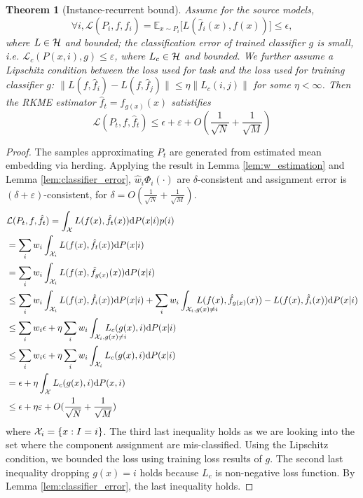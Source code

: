 \documentclass[paper=letter, fontsize=20pt]{article}
\newtheorem{Theorem}{Theorem}
\begin{document}
\begin{Theorem}[Instance-recurrent bound] 
Assume for the source models, $$\forall i, \mathcal{L}(P_i,f, \hat{f}_i)=\mathds{E}_{x\sim P_i }\big[L(\widehat{f}_i(x),f(x))\big]\leq \epsilon,$$ where $L \in \mathcal{H}$ and bounded; the classification error of trained classifier $g$ is small, i.e. $\mathcal{L}_c(P(x,i),g)\leq \varepsilon$, where $L_c \in \mathcal{H}$ and bounded. We further assume a Lipschitz condition between the loss used for task and the loss used for training classifier $g$: $\|L(f, \hat{f}_i) -L(f, \hat{f}_j)\| \leq \eta \| L_c(i,j) \| $ for some $\eta < \infty$. Then the RKME estimator $\hat{f}_t = f_{g(x)}(x)$ satistifies 
$$\mathcal{L}(P_t,f,\hat{f}_t) \leq \epsilon + \varepsilon + O(\frac{1}{\sqrt{N}} + \frac{1}{\sqrt{M}})$$
\end{Theorem}

\begin{proof}
The samples approximating $P_t$ are generated from estimated mean embedding via herding.  Applying the result in Lemma \ref{lem:w_estimation} and Lemma \ref{lem:classifier_error}, $\widehat{w}_i\Phi_i(\cdot)$ are $\delta$-consistent and assignment error is $(\delta+\varepsilon)$-consistent, for $\delta =O(\frac{1}{\sqrt{N}} + \frac{1}{\sqrt{M}}) $.
\begin{align*}
&\mathcal{L}(P_t,f, \hat{f}_t)=\int_{\X} L(f(x),\hat{f}_t(x)) \dP(x|i)p(i)  \\
&= \sum_i w_i \int_{\X_i} L(f(x),\hat{f}_t(x))\dP(x|i)\\
&=\sum_i w_i \int_{\X_i} L(f(x),\hat{f}_{g(x)}(x)) \dP(x|i) \\
& \leq \sum_i w_i \int_{\X_i} L(f(x),\hat{f}_{i}(x)) \dP(x|i)
+ \sum_i w_i \int_{\X_i, g(x)\neq i} \hspace{-.9cm}L(f(x),\hat{f}_{g(x)}(x)) - L(f(x),\hat{f}_{i}(x)) \dP(x|i)\\
&\leq \sum_i w_i \epsilon + \eta \sum_i w_i \int_{\X_i, g(x)\neq i} \hspace{-0.9cm}L_c(g(x), i)\dP(x|i)\\
&\leq \sum_i w_i \epsilon + \eta \sum_i w_i \int_{\X_i} L_c(g(x), i)\dP(x|i)\\
&= \epsilon + \eta \int_{\X} L_c(g(x), i)\dP(x,i)\\
&\leq \epsilon + \eta \varepsilon + O(\frac{1}{\sqrt{N}} + \frac{1}{\sqrt{M}})
\end{align*}
where $\mathcal{X}_i = \{x: I=i\}$.
The third last inequality holds as we are looking into the set where the component assignment are mis-classified. Using the Lipschitz condition, we bounded the loss using training loss results of $g$.
The second last inequality dropping $g(x)=i$ holds because $L_c$ is non-negative loss function.
By Lemma \ref{lem:classifier_error}, the last inequality holds.
\end{proof}
\end{document}

